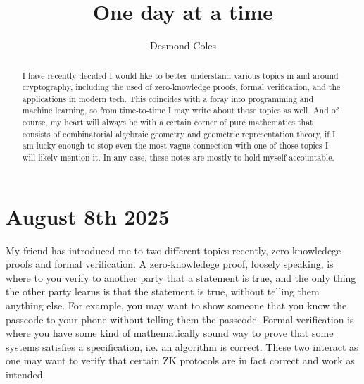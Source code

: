 \documentclass{amsart}
\title{One day at a time}
\date{}
\author{Desmond Coles}
\theoremstyle{definition}
\begin{document}
\begin{abstract}
    I have recently decided I would like to better understand various topics in and around cryptography, including the used of zero-knowledge proofs, formal verification, and the applications in modern tech. This coincides with a foray into programming and machine learning, so from time-to-time I may write about those topics as well. And of course, my heart will always be with a certain corner of pure mathematics that consists of combinatorial algebraic geometry and geometric representation theory, if I am lucky enough to stop even the most vague connection with one of those topics I will likely mention it. In any case, these notes are mostly to hold myself accountable.
\end{abstract}


\maketitle


\section*{August 8th 2025}
My friend has introduced me to two different topics recently, zero-knowledege proofs and formal verification. A zero-knowledege proof, loosely speaking, is where to you verify to another party that a statement is true, and the only thing the other party learns is that the statement is true, without telling them anything else. For example, you may want to show someone that you know the passcode to your phone without telling them the passcode. Formal verification is where you have some kind of mathematically sound way to prove that some systems satisfies a specification, i.e. an algorithm is correct. These two interact as one may want to verify that certain ZK protocols are in fact correct and work as intended.
\end{document}
